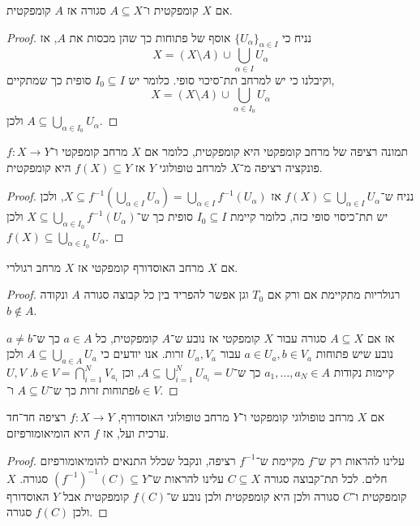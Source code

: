 \begin{proposition}
	אם $X$ קומפקטית ו־$A \subseteq X$ סגורה אז $A$ קומפקטית.
\end{proposition}
\begin{proof}
	נניח כי ${\{ U_{\alpha} \}}_{\alpha \in I}$ אוסף של פתוחות כך שהן מכסות את $A$, אז
	\[
		X = (X \setminus A) \cup \bigcup_{\alpha \in I} U_{\alpha}
	\]
	וקיבלנו כי יש למרחב תת־סיכוי סופי.
	כלומר יש $I_{0} \subseteq I$ סופית כך שמתקיים,
	\[
		X = (X \setminus A) \cup \bigcup_{\alpha \in I_{0}} U_{\alpha}
	\]
	ולכן $A \subseteq \bigcup_{\alpha \in I_{0}} U_{\alpha}$.
\end{proof}
\begin{proposition}
	תמונה רציפה של מרחב קומפקטי היא קומפקטית,
	כלומר אם $X$ מרחב קומפקטי ו־$f : X \to Y$ פונקציה רציפה מ־$X$ למרחב טופולוגי $Y$ אז $f(X) \subseteq Y$ היא קומפקטית.
\end{proposition}
\begin{proof}
	נניח ש־$f(X) \subseteq \bigcup_{\alpha \in I} U_{\alpha}$ אז $X \subseteq f^{-1}( \bigcup_{\alpha \in I} U_{\alpha}) = \bigcup_{\alpha \in I} f^{-1}(U_{\alpha})$,
	ולכן יש תת־כיסוי סופי כזה, כלומר קיימת $I_{0} \subseteq I$ סופית כך ש־$X \subseteq \bigcup_{\alpha \in I_{0}} f^{-1}(U_{\alpha})$ ולכן $f(X) \subseteq \bigcup_{\alpha \in I_{0}} U_{\alpha}$.
\end{proof}
\begin{proposition}
	אם $X$ מרחב האוסדורף קומפקטי אז $X$ מרחב רגולרי.
\end{proposition}
\begin{proof}
	רגולריות מתקיימת אם ורק אם $T_0$ וגן אפשר להפריד בין כל קבוצה סגורה $A$ ונקודה $b \notin A$.

	אז אם $A \subseteq X$ סגורה עבור $X$ קומפקטי אז נובע ש־$A$ קומפקטית, כל $a \in A$ כך ש־$a \ne b$ נובע שיש פתוחות $a \in U_a, b \in V_a$ עבור $U_a, V_a$ זרות.
	אנו יודעים כי $A \subseteq \bigcup_{a \in A} U_a$ ולכן קיימות נקודות $a_1, \ldots, a_N \in A$ כך ש־$A  \subseteq \bigcup_{i = 1}^N U_{a_i} = U$,
	וכן $b \in V = \bigcap_{i = 1}^N V_{a_i}$.
	$U, V$ פתוחות זרות כך ש־$A \subseteq U$ ו־$b \in V$.
\end{proof}
\begin{corollary}
	אם $X$ מרחב טופולוגי קומפקטי ו־$Y$ מרחב טופולוגי האוסדורף, $f : X \to Y$ רציפה חד־חד ערכית ועל, אז $f$ היא הומיאומורפיזם.
\end{corollary}
\begin{proof}
	עלינו להראות רק ש־$f$ מקיימת ש־$f^{-1}$ רציפה, ונקבל שכלל התנאים להומיאומורפיזם חלים.
	לכל תת־קבוצה סגורה $C \subseteq X$ עלינו להראות ש־${(f^{-1})}^{-1}(C) \subseteq Y$ סגורה.
	$X$ קומפקטית ו־$C$ סגורה ולכן היא קומפקטית ולכן נובע ש־$f(C)$ קומפקטית אבל $Y$ האוסדורף ולכן $f(C)$ סגורה.
\end{proof}
